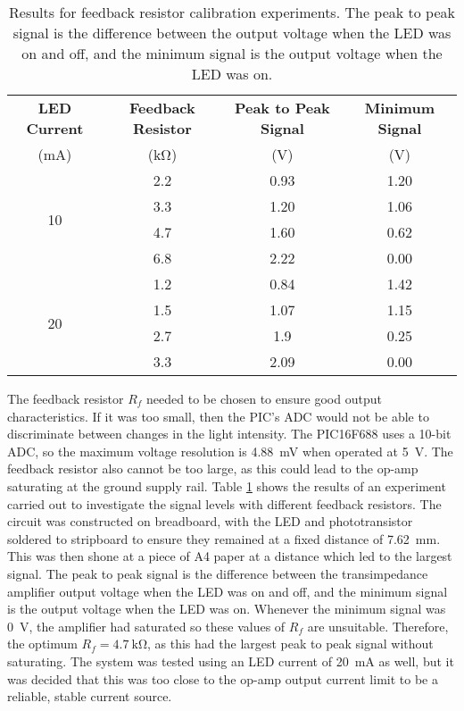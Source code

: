 \begin{table}[htbp]
	\centering
	\caption{Results for feedback resistor calibration experiments. The peak to peak signal is the difference between the output voltage when the LED was on and off, and the minimum signal is the output voltage when the LED was on.}
	\label{tab: tia feedback resistor}
	\begin{tabular}{|c|c|c|c|}
		\hline
		\textbf{LED Current} & \textbf{Feedback Resistor} & \textbf{Peak to Peak Signal} & \textbf{Minimum Signal}\\
		(mA)	&	(\si{\kilo\ohm})	&	(V)	&	(V)\\
		\hline
		\multirow{4}{*}{10}	&	2.2	&	0.93	&	1.20\\
						\cline{2-4}
						&	3.3	&	1.20	&	1.06\\
						\cline{2-4}
						&	4.7	&	1.60	&	0.62\\
						\cline{2-4}
						&	6.8	&	2.22	&	0.00\\
		\hline
		\multirow{4}{*}{20}	&	1.2	&	0.84	&	1.42\\
						\cline{2-4}
						&	1.5	&	1.07	&	1.15\\
						\cline{2-4}
						&	2.7	&	1.9	&	0.25\\
						\cline{2-4}
						&	3.3	&	2.09	&	0.00\\
		\hline
	\end{tabular}
\end{table}

The feedback resistor $R_f$ needed to be chosen to ensure good output characteristics. If it was too small, then the PIC's ADC would not be able to discriminate between changes in the light intensity.  The PIC16F688 uses a 10-bit ADC, so the maximum voltage resolution is \SI{4.88}{\milli\volt} when operated at \SI{5}{\volt}. The feedback resistor also cannot be too large, as this could lead to the op-amp saturating at the ground supply rail. Table \ref{tab: tia feedback resistor} shows the results of an experiment carried out to investigate the signal levels with different feedback resistors. The circuit was constructed on breadboard, with the LED and phototransistor soldered to stripboard to ensure they remained at a fixed distance of \SI{7.62}{\milli\metre}. This was then shone at a piece of A4 paper at a distance which led to the largest signal. The peak to peak signal is the difference between the transimpedance amplifier output voltage when the LED was on and off, and the minimum signal is the output voltage when the LED was on. Whenever the minimum signal was \SI{0}{\volt}, the amplifier had saturated so these values of $R_f$ are unsuitable. Therefore, the optimum $R_f = \SI{4.7}{\kilo\ohm}$, as this had the largest peak to peak signal without saturating. The system was tested using an LED current of \SI{20}{\milli\ampere} as well, but it was decided that this was too close to the op-amp output current limit to be a reliable, stable current source.\\

